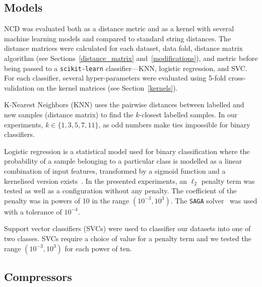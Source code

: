 \documentclass[preprint,12pt]{article}
\begin{document}
\subsection{Models}
\label{models}
NCD was evaluated both as a distance metric and as a kernel with several machine learning models and compared to standard string distances.
The distance matrices were calculated for each dataset, data fold, distance matrix algorithm (see Sections~\ref{distance_matrix} and~\ref{modifications}), and metric before being passed to a \texttt{scikit-learn} classifier---KNN, logistic regression, and SVC.
For each classifier, several hyper-parameters were evaluated using 5-fold cross-validation on the kernel matrices (see Section~\ref{kernels}).

K-Nearest Neighbors (KNN) uses the pairwise distances between labelled and new samples (distance matrix) to find the $k$-closest labelled samples.
In our experiments, $k 
\in \{1,3,5,7,11\}$, as odd numbers make ties impossible for binary classifiers.

Logistic regression is a statistical model used for binary classification where the probability of a sample belonging to a particular class is modelled as a linear combination of input features, transformed by a sigmoid function and a kernelised version exists~\cite{maalouf2011robust}.
In the presented experiments, an $\ell_2$ penalty term was tested as well as a configuration without any penalty. 
The coefficient of the penalty was in powers of 10 in the range $(10^{-3}, 10^3)$.
The \texttt{SAGA} solver~\cite{saga} was used with a tolerance of $10^{-4}$.

Support vector classifiers (SVCs) were used to classifier our datasets into one of two classes.
SVCs require a choice of value for a penalty term and we tested the range $(10^{-3}, 10^3)$ for each power of ten.










\subsection{Compressors}
\label{compressors}
\end{document}
